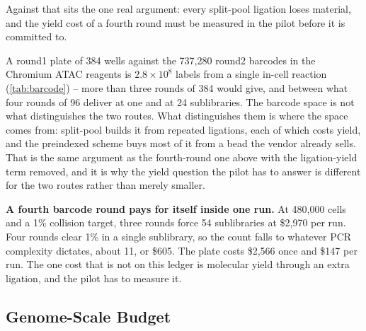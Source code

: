 Against that sits the one real argument: every split-pool ligation loses material,
and the yield cost of a fourth round must be measured in the pilot before it is
committed to.

 A round1 plate
of 384 wells against the 737{,}280 round2 barcodes in the Chromium ATAC reagents
is $2.8\times10^{8}$ labels from a single in-cell reaction
(\cref{tab:barcode}) -- more than three rounds of 384 would give, and between
what four rounds of 96 deliver at one and at 24 sublibraries. The barcode space
is not what distinguishes the two routes. What distinguishes them is where the
space comes from: split-pool builds it from repeated ligations, each of which
costs yield, and the preindexed scheme buys most of it from a bead the vendor
already sells. That is the same argument as the fourth-round one above with the
ligation-yield term removed, and it is why the yield question the pilot has to
answer is different for the two routes rather than merely smaller.

\begin{keybox}
\textbf{A fourth barcode round pays for itself inside one run.} At 480{,}000
cells and a 1\% collision target, three rounds force 54 sublibraries at
\$2{,}970 per run. Four rounds clear 1\% in a single sublibrary, so the count
falls to whatever PCR complexity dictates, about 11, or \$605. The plate costs
\$2{,}566 once and \$147 per run. The one cost that is not on this ledger is
molecular yield through an extra ligation, and the pilot has to measure it.
\end{keybox}

\subsection{Genome-Scale Budget}
\label{sec:budget}



